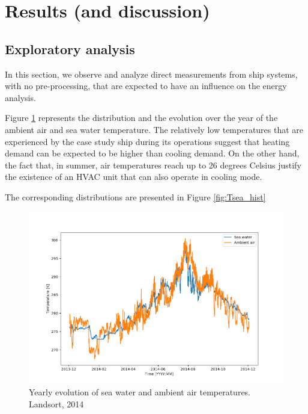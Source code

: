 \documentclass[preprint,12pt]{elsarticle}
\begin{document}
\section{Results (and discussion)}

\subsection{Exploratory analysis} \label{sec:res:exploratory}

In this section, we observe and analyze direct measurements from ship systems, with no pre-processing, that are expected to have an influence on the energy analysis.

Figure \ref{fig:Tsea_vs_time} represents the distribution and the evolution over the year of the ambient air and sea water temperature. The relatively low temperatures that are experienced by the case study ship during its operations suggest that heating demand can be expected to be higher than cooling demand. On the other hand, the fact that, in summer, air temperatures reach up to 26 degrees Celsius justify the existence of an HVAC unit that can also operate in cooling mode. 

The corresponding distributions are presented in Figure \ref{fig:Tsea_hist}

\begin{figure}
	\centering
	\includegraphics[width=0.9\linewidth]{Figures/Tsea_vs_time}
	\caption{Yearly evolution of sea water and ambient air temperatures. Landsort, 2014}
	\label{fig:Tsea_vs_time}
\end{figure}
\end{document}
